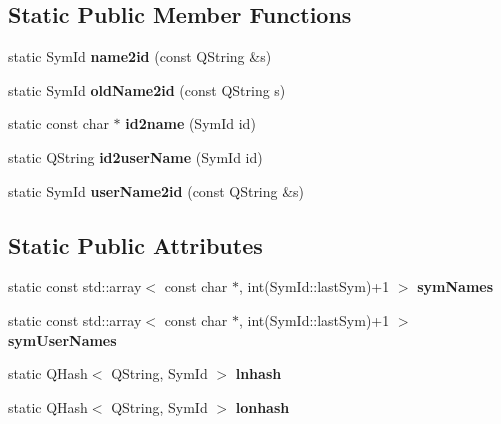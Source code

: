 \subsection*{Static Public Member Functions}
\begin{DoxyCompactItemize}
\item 
\mbox{\label{class_ms_1_1_sym_a448697eb20352ee6ed97d7b62b30ec50}} 
static Sym\+Id {\bfseries name2id} (const Q\+String \&s)
\item 
\mbox{\label{class_ms_1_1_sym_a8deb86ac2a29939229fbbac571c1da82}} 
static Sym\+Id {\bfseries old\+Name2id} (const Q\+String s)
\item 
\mbox{\label{class_ms_1_1_sym_a22c99b468ad865640f9fa18ab9efc0b5}} 
static const char $\ast$ {\bfseries id2name} (Sym\+Id id)
\item 
\mbox{\label{class_ms_1_1_sym_a53b5ddb1afaa88a6b7506e9f7ddeb4be}} 
static Q\+String {\bfseries id2user\+Name} (Sym\+Id id)
\item 
\mbox{\label{class_ms_1_1_sym_a478bcf95f2a6f01468371c309d562f45}} 
static Sym\+Id {\bfseries user\+Name2id} (const Q\+String \&s)
\end{DoxyCompactItemize}
\subsection*{Static Public Attributes}
\begin{DoxyCompactItemize}
\item 
\mbox{\label{class_ms_1_1_sym_a16a8c649ab0c8a1535108f80f6a3d277}} 
static const std\+::array$<$ const char $\ast$, int(Sym\+Id\+::last\+Sym)+1 $>$ {\bfseries sym\+Names}
\item 
\mbox{\label{class_ms_1_1_sym_a8ed7346c59b20ba0ab7c6b06c1ba9544}} 
static const std\+::array$<$ const char $\ast$, int(Sym\+Id\+::last\+Sym)+1 $>$ {\bfseries sym\+User\+Names}
\item 
\mbox{\label{class_ms_1_1_sym_ae87b805a215e50af234a33a5ec6e02d6}} 
static Q\+Hash$<$ Q\+String, Sym\+Id $>$ {\bfseries lnhash}
\item 
\mbox{\label{class_ms_1_1_sym_ac764e104b0a814820dcf3af479cfcc4b}} 
static Q\+Hash$<$ Q\+String, Sym\+Id $>$ {\bfseries lonhash}
\end{DoxyCompactItemize}
